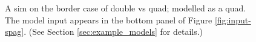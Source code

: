 \documentclass[12pt,preprint]{aastex}
\begin{document}
\begin{figure}
{  }
  \caption[result 6919 (ASW0002z6f)]{A sim on the border case of
    double vs quad; modelled as a quad.  The model input appears in
    the bottom panel of Figure \ref{fig:input-spag}. (See Section
    \ref{sec:example_models} for details.)}
  \label{fig:6919}
\end{figure}
\end{document}
